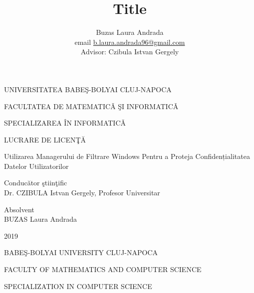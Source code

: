 \documentclass[12pt]{extreport}
\title{Title}
\author{
	Buzas Laura Andrada
	\\ email \href{mailto:b.laura.andrada96@gmail.com}{b.laura.andrada96@gmail.com}
	\\ [1cm]{\normalsize Advisor: Czibula Istvan Gergely }
}
\date{}
\begin{document}
	
	
	\pagestyle{empty}
	\begin{titlepage}
		
		\begin{center}
			{\Large UNIVERSITATEA BABEŞ-BOLYAI CLUJ-NAPOCA}
		\end{center}
		
		\begin{center}
			{\Large FACULTATEA DE MATEMATICǍ ŞI INFORMATICǍ}
		\end{center}
		
		\begin{center}
			{\Large SPECIALIZAREA ÎN INFORMATICǍ}
		\end{center}
		
		\vfill
		
		\begin{center}
			{\LARGE LUCRARE DE LICENŢĂ}
		\end{center}
		
		\begin{center}
			{\Huge Utilizarea Managerului de Filtrare Windows Pentru a Proteja Confidențialitatea Datelor Utilizatorilor}
		\end{center}
		
		\vfill
		
		\begin{flushleft}
			{\LARGE Conducător ştiinţific  \\ Dr. CZIBULA Istvan Gergely, Profesor Universitar}
		\end{flushleft}
		
		\begin{flushright}
			{\Large Absolvent \\ BUZAS Laura Andrada}
		\end{flushright}
		
		\vfill
		
		\begin{center}
			{\LARGE 2019}
		\end{center}
		
		\pagebreak
		
		\begin{center}
			{\Large BABEŞ-BOLYAI UNIVERSITY CLUJ-NAPOCA}
		\end{center}
		
		\begin{center}
			{\Large FACULTY OF MATHEMATICS AND COMPUTER SCIENCE}
		\end{center}
		
		\begin{center}
			{\Large SPECIALIZATION IN COMPUTER SCIENCE}
		\end{center}
		

\end{titlepage}
\end{document}
